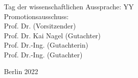 \begin{flushright}
	\hrulefill

 	Tag der wissenschaftlichen Aussprache: YY  \\

	\vspace{5mm}
	Promotionsausschuss:\\
	Prof. Dr. (Vorsitzender)\\
    	Prof. Dr. Kai Nagel (Gutachter)\\
    	Prof. Dr.-Ing.  (Gutachterin)\\
     	Prof. Dr.-Ing. (Gutachter)\\
	\vspace{6mm}

	Berlin 2022\\

\end{flushright}